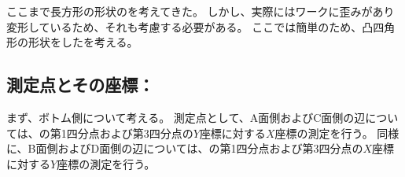 \clearpage
ここまで長方形の形状の\EndFaceCChamferMilling を考えてきた。
しかし、実際にはワークに歪みがあり変形しているため、それも考慮する必要がある。
ここでは簡単のため、凸四角形の形状をした\EndFaceCChamferMilling を考える。


\subsection{測定点とその座標：\BottomEndFaceOutChamfer}
まず、ボトム側について考える。
測定点として、A面側およびC面側の辺については、\BDOD の第1四分点および第3四分点の$Y$座標に対する$X$座標の測定を行う。
同様に、B面側およびD面側の辺については、\ACOD の第1四分点および第3四分点の$X$座標に対する$Y$座標の測定を行う。

